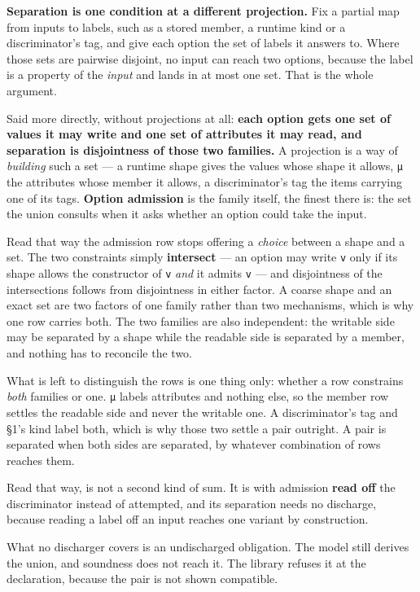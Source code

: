 \textbf{Separation is one condition at a different projection.} Fix a partial map from inputs to
labels, such as a stored member, a runtime kind or a discriminator's tag, and give each option the set of
labels it answers to. Where those sets are pairwise disjoint, no input can reach two options,
because the label is a property of the \emph{input} and lands in at most one set. That is the whole
argument.

Said more directly, without projections at all: \textbf{each option gets one set of values it may write
and one set of attributes it may read, and separation is disjointness of those two families.} A
projection is a way of \emph{building} such a set — a runtime shape gives the values whose shape it
allows, \texttt{μ} the attributes whose member it allows, a discriminator's tag the items carrying one of
its tags. \textbf{Option admission} is the family itself, the finest there is: the set the union
consults when it asks whether an option could take the input.

Read that way the admission row stops offering a \emph{choice} between a shape and a set. The two constraints
simply \textbf{intersect} — an option may write \texttt{v} only if its shape allows the constructor of \texttt{v} \emph{and}
it admits \texttt{v} — and disjointness of the intersections follows from disjointness in either factor. A
coarse shape and an exact set are two factors of one family rather than two mechanisms, which is why
one row carries both. The two families are also independent: the writable side may be separated by
a shape while the readable side is separated by a member, and nothing has to reconcile the two.

What is left to distinguish the rows is one thing only: whether a row constrains \emph{both} families or
one. \texttt{μ} labels attributes and nothing else, so the member row settles the readable side and never
the writable one. A discriminator's tag and §1's kind label both, which is why those two settle a
pair outright. A pair is separated when both sides are separated, by whatever combination of rows
reaches them.

Read that way,  is not a second kind of sum. It is  with admission \textbf{read
off} the discriminator instead of attempted, and its separation needs no discharge, because reading a
label off an input reaches one variant by construction.

What no discharger covers is an undischarged obligation. The model still derives the union, and
soundness does not reach it. The library refuses it at the declaration, because the pair is not
shown compatible.


